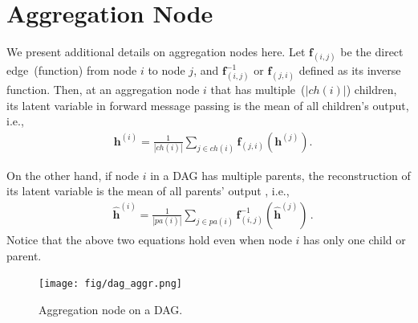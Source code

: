 \documentclass[sigconf, anonymous, review]{acmart}
\theoremstyle{plain}
\theoremstyle{definition}
\theoremstyle{remark}
\begin{document}

\section{Aggregation Node}\label{sec:aggr_supp}
We present additional details on aggregation nodes here. 
Let $\mathbf{f}_{(i, j)}$ be the direct edge~(function) from node $i$ to node $j$, and $\mathbf{f}^{-1}_{ (i, j)}$ or  $\mathbf{f}_{ (j, i)}$ defined as its inverse function. Then, at an aggregation node $i$ that has multiple~($|ch(i)|$) children, its latent variable in forward message passing is the mean of all children's output, i.e.,
 \begin{align}\label{eq:child_avg}
&  \mathbf{h}^{(i)} = \frac{1}{|ch(i)|} \sum_{j \in ch(i) } \mathbf{f}_{(j,i)}(\mathbf{h}^{(j)})  .
\end{align}%

On the other hand, if node $i$ in a DAG  has multiple parents, the reconstruction of its latent variable is the mean of all parents' output , i.e.,
 \begin{align}\label{eq:parent_avg}
 &\widehat{\mathbf{h}}^{(i)} = \frac{1}{|pa(i)|} \sum_{j \in pa(i) } \mathbf{f}^{-1}_{ (i,j)}(\widehat{\mathbf{h}}^{(j)}) \, .
\end{align} %
Notice that the above two equations hold even when node $i$ has only one child or parent.

\begin{figure}[ht]
\begin{center}
 \texttt{[image: fig/dag\_aggr.png]}
\end{center}
\vspace{-0.1in}
\caption{ {\small  Aggregation node on a DAG.}}
\label{fig:dag_aggr}
\end{figure}
\end{document}

